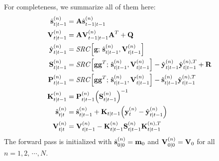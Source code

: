 			For completeness, we summarize all of them here:
			\begin{align*}
				\hat{\boldsymbol{\mathrm{s}}}_{t \vert t - 1}^{(n)} &= \boldsymbol{\mathrm{A}} \hat{\boldsymbol{\mathrm{s}}}_{t - 1 \vert t - 1}^{(n)} \\
				\boldsymbol{\mathrm{V}}_{t \vert t - 1}^{(n)} &= \boldsymbol{\mathrm{A}} \boldsymbol{\mathrm{V}}_{t - 1 \vert t - 1}^{(n)} \boldsymbol{\mathrm{A}}^T + \boldsymbol{\mathrm{Q}} \\
				\hat{\boldsymbol{\mathrm{y}}}_{t \vert t - 1}^{(n)} &= \mathit{SRC}\Big[ \boldsymbol{\mathrm{g}};\, \hat{\boldsymbol{\mathrm{s}}}_{t \vert t - 1}^{(n)}, \boldsymbol{\mathrm{V}}_{t \vert t - 1}^{(n)} \Big] \\
				\boldsymbol{\mathrm{S}}_{t \vert t - 1}^{(n)} &= \mathit{SRC}\Big[ \boldsymbol{\mathrm{g}} \boldsymbol{\mathrm{g}}^T;\, \hat{\boldsymbol{\mathrm{s}}}_{t \vert t - 1}^{(n)}, \boldsymbol{\mathrm{V}}_{t \vert t - 1}^{(n)} \Big] - \hat{\boldsymbol{\mathrm{y}}}_{t \vert t - 1}^{(n)} \hat{\boldsymbol{\mathrm{y}}}_{t \vert t - 1}^{(n), T} + \boldsymbol{\mathrm{R}} \\
				\boldsymbol{\mathrm{P}}_{t \vert t - 1}^{(n)} &= \mathit{SRC}\Big[ \boldsymbol{\mathrm{g}} \boldsymbol{\mathrm{g}}^T;\, \hat{\boldsymbol{\mathrm{s}}}_{t \vert t - 1}^{(n)}, \boldsymbol{\mathrm{V}}_{t \vert t - 1}^{(n)} \Big] - \hat{\boldsymbol{\mathrm{s}}}_{t \vert t - 1}^{(n)} \hat{\boldsymbol{\mathrm{y}}}_{t \vert t - 1}^{(n), T} \\
				\boldsymbol{\mathrm{K}}_{t \vert t - 1}^{(n)} &= \boldsymbol{\mathrm{P}}_{t \vert t - 1}^{(n)} \Big(\boldsymbol{\mathrm{S}}_{t \vert t - 1}^{(n)}\Big)^{-1} \\
				\hat{\boldsymbol{\mathrm{s}}}_{t \vert t}^{(n)} &= \hat{\boldsymbol{\mathrm{s}}}_{t \vert t - 1}^{(n)} + \boldsymbol{\mathrm{K}}_{t \vert t - 1} \Big(\boldsymbol{\mathrm{y}}_t^{(n)} - \hat{\boldsymbol{\mathrm{y}}}_{t \vert t - 1}^{(n)}\Big) \\
				\boldsymbol{\mathrm{V}}_{t \vert t}^{(n)} &= \boldsymbol{\mathrm{V}}_{t \vert t - 1}^{(n)} - \boldsymbol{\mathrm{K}}_{t \vert t - 1}^{(n)} \boldsymbol{\mathrm{S}}_{t \vert t - 1}^{(n)} \boldsymbol{\mathrm{K}}_{t \vert t - 1}^{(n), T}
			\end{align*}
			The forward pass is initialized with \( \hat{\boldsymbol{\mathrm{s}}}_{0 \vert 0}^{(n)} = \boldsymbol{\mathrm{m}}_0 \) and \( \boldsymbol{\mathrm{V}}_{0 \vert 0}^{(n)} = \boldsymbol{\mathrm{V}}_0 \) for all \( n = 1, 2, \,\cdots\!, N \).

